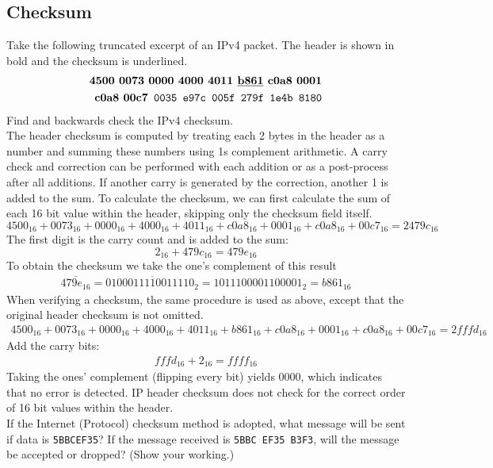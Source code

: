 \documentclass{article}
\begin{document}
\subsection*{Checksum}
Take the following truncated excerpt of an IPv4 packet. The header is shown in bold and the checksum is underlined.
\begin{align*}
    \texttt{{\bf 4500 0073 0000 4000 4011 \underline{b861} c0a8 0001}} \\
    \texttt{{\bf c0a8 00c7} 0035 e97c 005f 279f 1e4b 8180}\\
\end{align*}
Find and backwards check the IPv4 checksum.\\[1\baselineskip]
The header checksum is computed by treating each 2 bytes in the header as a number and summing these numbers using 1s complement arithmetic. A carry check and correction can be performed with each addition or as a post-process after all additions. If another carry is generated by the correction, another 1 is added to the sum. To calculate the checksum, we can first calculate the sum of each 16 bit value within the header, skipping only the checksum field itself.
\[
    4500_{16} + 0073_{16} + 0000_{16} + 4000_{16} + 4011_{16} + c0a8_{16} + 0001_{16} + c0a8_{16} + 00c7_{16} = 2479c_{16}
\]
The first digit is the carry count and is added to the sum:
\[
    2_{16} + 479c_{16} = 479e_{16}
\]
To obtain the checksum we take the one's complement of this result
\begin{align*}
    \overline{479e_{16}} = \overline{0100011110011110_{2}} = 1011100001100001_{2} = b861_{16}
\end{align*}
When verifying a checksum, the same procedure is used as above, except that the original header checksum is not omitted.
\begin{align*}
    4500_{16} + 0073_{16} + 0000_{16} + 4000_{16} + 4011_{16} + b861_{16} + c0a8_{16} + 0001_{16} + c0a8_{16} + 00c7_{16} = 2fffd_{16}
\end{align*}
Add the carry bits:
\begin{align*}
    fffd_{16} + 2_{16} = ffff_{16}
\end{align*}
Taking the ones' complement (flipping every bit) yields 0000, which indicates that no error is detected. IP header checksum does not check for the correct order of 16 bit values within the header. \\[3\baselineskip]
If the Internet (Protocol) checksum method is adopted, what message will be sent if data is \texttt{5BBCEF35}? If the message received is  \texttt{5BBC EF35 B3F3}, will the message be accepted or dropped? (Show your working.)\\[1\baselineskip]
\end{document}
